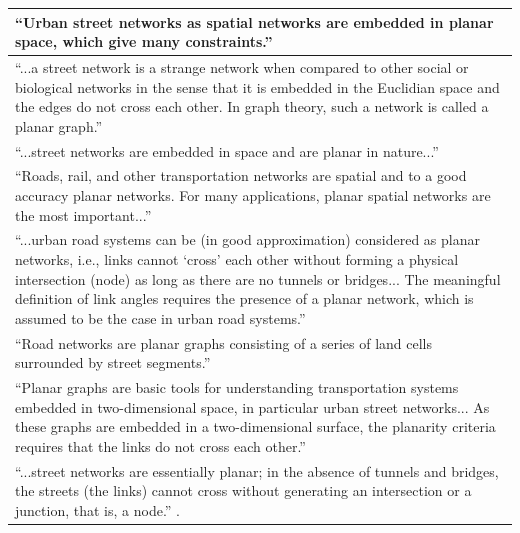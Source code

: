 \documentclass[Afour,sageh,times]{sagej}
\begin{document}
\begin{table}[htbp]
\begin{tabular}{ | p{} | }
\enquote{Urban street networks as spatial networks are embedded in planar space, which give many constraints.} \citep[p.~1]{hu_topological_2008} \\ \hline

\enquote{...a street network is a strange network when compared to other social or biological networks in the sense that it is embedded in the Euclidian space and the edges do not cross each other. In graph theory, such a network is called a planar graph.} \citep[p.~259]{masucci_random_2009} \\ \hline

\enquote{...street networks are embedded in space and are planar in nature...} \citep[p.~114]{porta_networks_2010} \\ \hline

\enquote{Roads, rail, and other transportation networks are spatial and to a good accuracy planar networks. For many applications, planar spatial networks are the most important...} \citep[p.~3]{barthelemy_spatial_2011} \\ \hline

\enquote{...urban road systems can be (in good approximation) considered as planar networks, i.e., links cannot \enquote{cross} each other without forming a physical intersection (node) as long as there are no tunnels or bridges... The meaningful definition of link angles requires the presence of a planar network, which is assumed to be the case in urban road systems.} \citep[pp.~563~\&~567]{chan_urban_2011} \\ \hline

\enquote{Road networks are planar graphs consisting of a series of land cells surrounded by street segments.} \citep[p.~3]{strano_elementary_2012} \\ \hline

\enquote{Planar graphs are basic tools for understanding transportation systems embedded in two-dimensional space, in particular urban street networks... As these graphs are embedded in a two-dimensional surface, the
planarity criteria requires that the links do not cross each other.} \citep[p.~1]{masucci_limited_2013} \\ \hline

\enquote{...street networks are essentially planar; in the absence of tunnels and bridges, the streets (the links) cannot cross without generating an intersection or a junction, that is, a node.} \citep[p.~1]{gudmundsson_entropy_2013}. \\ \hline


\end{tabular}
\end{table}
\end{document}
